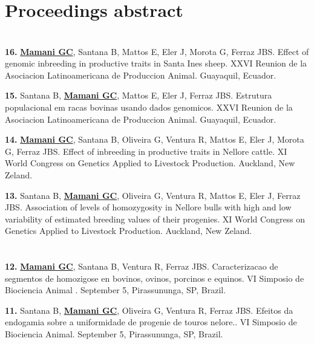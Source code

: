 \documentclass[margin,line,10pt]{res}
\newenvironment{list1}{
  \begin{list}{\ding{113}}{%
      \setlength{\itemsep}{0in}
      \setlength{\parsep}{0in} \setlength{\parskip}{0in}
      \setlength{\topsep}{0in} \setlength{\partopsep}{0in} 
      \setlength{\leftmargin}{0.17in}}}{\end{list}}
\begin{document}
\begin{resume}
\vspace{0.5cm}
\section{\sc Proceedings abstract}
\vspace{0.9cm}

\section{}
\begin{list1}

\item [\bf{16}.] {\bf \underline{Mamani GC}}, Santana B, Mattos E, Eler J, Morota G, Ferraz JBS. Effect of genomic inbreeding in productive traits in Santa Ines sheep.
XXVI Reunion de la Asociacion Latinoamericana de Produccion Animal. Guayaquil, Ecuador. 
\vspace{0.5cm}
\item [\bf{15}.] Santana B, {\bf \underline{Mamani GC}}, Mattos E, Eler J, Ferraz JBS. 
Estrutura populacional em racas bovinas usando dados genomicos. 
XXVI Reunion de la Asociacion Latinoamericana de Produccion Animal. Guayaquil, Ecuador. 
\vspace{0.5cm}
\item [\bf{14}.] {\bf \underline{Mamani GC}}, Santana B, Oliveira G, Ventura R, Mattos E, Eler J, Morota G, Ferraz JBS. 
Effect of inbreeding in productive traits in Nellore cattle.
XI World Congress on Genetics Applied to Livestock Production. Auckland, New Zeland. 
\vspace{0.5cm}
\item [\bf{13}.] Santana B, {\bf \underline{Mamani GC}}, Oliveira G, Ventura R, Mattos E, Eler J, Ferraz JBS. 
Association of levels of homozygosity in Nellore bulls with high and low variability of estimated breeding values of their progenies.
XI World Congress on Genetics Applied to Livestock Production. Auckland, New Zeland. 
\end{list1}

\section{}
\begin{list1}
\item [\bf{12}.] {\bf \underline{Mamani GC}}, Santana B,  Ventura R, Ferraz JBS. 
Caracterizacao de segmentos de homozigose en bovinos, ovinos, porcinos e equinos.
VI Simposio de Biociencia Animal . September 5, Pirassununga, SP, Brazil. 
\vspace{0.5cm}
\item [\bf{11}.] Santana B, {\bf \underline{Mamani GC}}, Oliveira G,  Ventura R, Ferraz JBS. 
Efeitos da endogamia sobre a uniformidade de progenie de touros nelore..
VI Simposio de Biociencia Animal. September 5, Pirassununga, SP, Brazil. 
\end{list1}


\end{resume}
\end{document}

